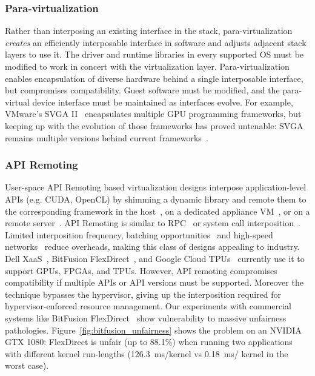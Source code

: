 \subsubsection{Para-virtualization}
Rather than interposing an existing interface in the stack,
para-virtualization~\cite{suzuki2014gpuvm,dowty2009gpu,vasila-gvm16,
vmm-independent-gfx-vee07,harel-efficient13atc,exitless-paravirtual-io,
vmm-bypass-atc06, self-virt-hpdc07,vmware-hosted-io-atc01,
direct-access-virt-io-atc08, paradice} \emph{creates} an efficiently
interposable interface in software and adjusts adjacent stack layers to use
it. The driver and runtime libraries in every supported OS must be
modified to work in concert with the virtualization layer.
Para-virtualization enables encapsulation of diverse hardware behind a single
interposable interface, but compromises compatibility. Guest software must be
modified, and the para-virtual device interface must be maintained as
interfaces evolve.
For example, VMware's SVGA II~\cite{dowty2009gpu} encapsulates multiple GPU
programming frameworks, but keeping up with the evolution of those frameworks
has proved untenable: SVGA remains multiple versions  behind current
frameworks~\cite{vmware_version,svga_guest}.

\subsubsection{API Remoting}
User-space API Remoting based virtualization designs interpose
application-level APIs (e.g. CUDA, OpenCL) by shimming a dynamic library and
remote them to the corresponding framework in the host~\cite{shi2012vcuda,
gupta2009gvim, gVirtuS}, on a dedicated appliance VM~\cite{vmCUDA}, or on a
remote server~\cite{rCUDA,rCUDAnew,GridCuda,kim2012snucl,VCL,Duato2009,Li2011}.
API Remoting is similar to RPC~\cite{nfs,sunrpc} or system call
interposition~\cite{paradice, nooks, rio, vrio}.
Limited interposition frequency, batching opportunities~\cite{rCUDA} and
high-speed networks~\cite{deplyrcuda, bitfusion} reduce overheads, making this
class of designs appealing to industry. Dell XaaS~\cite{xaas}, BitFusion
FlexDirect~\cite{bitfusion}, and Google Cloud TPUs~\cite{cloud-tpu} currently
use it to support GPUs, FPGAs, and TPUs.
However, API remoting compromises compatibility if multiple APIs or API
versions must be supported. Moreover the technique bypasses the hypervisor,
giving up the interposition required for hypervisor-enforced resource
management. Our experiments with commercial systems like BitFusion
FlexDirect~\cite{bitfusion} show vulnerability to massive unfairness
pathologies. Figure~\ref{fig:bitfusion_unfairness} shows the problem on an
NVIDIA GTX 1080: FlexDirect is unfair (up to 88.1\%) when running two
applications with different kernel run-lengths (126.3~ms/kernel vs 0.18~ms/
kernel in the worst case).

